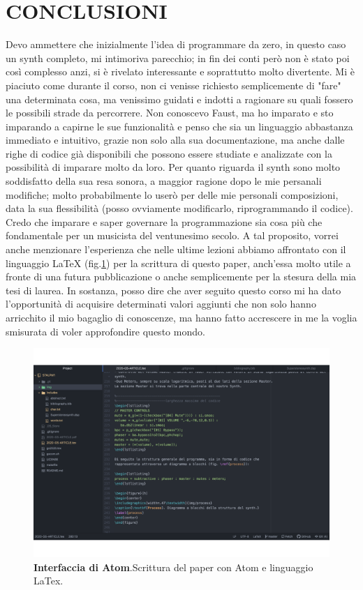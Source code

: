 \documentclass[
	a4paper,
	twocolumn
	]{article}
\begin{document}
\section*{CONCLUSIONI}
Devo ammettere che inizialmente l'idea di programmare da zero,
in questo caso un synth completo, mi intimoriva parecchio; in fin dei conti
però non è stato poi così complesso anzi, si è rivelato interessante e soprattutto
molto divertente. Mi è piaciuto come durante il corso, non ci venisse richiesto semplicemente
di "fare" una determinata cosa, ma venissimo guidati e indotti a ragionare su quali
fossero le possibili strade da percorrere. Non conoscevo Faust, ma ho imparato e sto imparando a
capirne le sue funzionalità e penso che sia un linguaggio abbastanza immediato e intuitivo,
grazie non solo alla sua documentazione, ma anche dalle righe di codice già disponibili che
possono essere studiate e analizzate con la possibilità di imparare molto da loro. Per quanto riguarda il synth
sono molto soddisfatto della sua resa sonora, a maggior ragione dopo le mie persanali modifiche; molto
probabilmente lo userò per delle mie personali composizioni, data la sua flessibilità
(posso ovviamente modificarlo, riprogrammando il codice). Credo che imparare e saper
governare la programmazione sia cosa più che fondamentale per un musicista del ventunesimo secolo.
A tal proposito, vorrei anche menzionare l'esperienza che nelle ultime lezioni abbiamo
affrontato con il linguaggio LaTeX (fig.\ref{latex}) per la scrittura di questo paper, anch'essa molto utile a fronte
di una futura pubblicazione o anche semplicemente per la stesura
della mia tesi di laurea. In sostanza, posso dire che aver seguito questo corso mi ha dato l'opportunità di
acquisire determinati valori aggiunti che non solo hanno arricchito il mio bagaglio di conoscenze,
ma hanno fatto accrescere in me la voglia smisurata di voler approfondire questo mondo.

\begin{figure}[h]
\begin{center}
\includegraphics[width=.47\textwidth]{img/latex}
\caption{\textbf{Interfaccia di Atom}.Scrittura del paper con Atom e linguaggio LaTex.}
\label{latex}
\end{center}
\end{figure}
\end{document}

